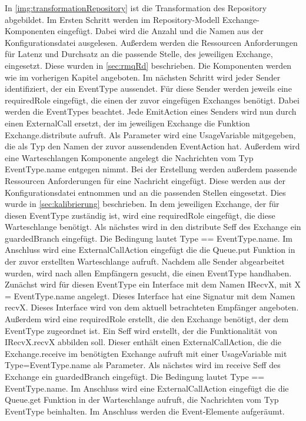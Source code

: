 In \autoref{img:transformationRepository} ist die Transformation des Repository abgebildet. Im Ersten Schritt werden im Repository-Modell Exchange-Komponenten eingefügt. Dabei wird die Anzahl und die Namen aus der Konfigurationsdatei ausgelesen. Außerdem werden die Ressourcen Anforderungen für Latenz und Durchsatz an die passende Stelle, des jeweiligen Exchange, eingesetzt. Diese wurden in \autoref{sec:rmqRd} beschrieben. Die Komponenten werden wie im vorherigen Kapitel angeboten. Im nächsten Schritt wird jeder Sender identifiziert, der ein EventType aussendet. Für diese Sender werden jeweils eine requiredRole eingefügt, die einen der zuvor eingefügen Exchanges benötigt. Dabei werden die EventTypes beachtet. Jede EmitAction eines Senders wird nun durch einen ExternalCall ersetzt, der im jeweiligen Exchange die Funktion Exchange.distribute aufruft. Als Parameter wird eine UsageVariable mitgegeben, die als Typ den Namen der zuvor aussendenden EventAction hat. Außerdem wird eine Warteschlangen Komponente angelegt die Nachrichten vom Typ EventType.name entgegen nimmt. Bei der Erstellung werden außerdem passende Ressourcen Anforderungen für eine Nachricht eingefügt. Diese werden aus der Konfigurationsdatei entnommen und an die passenden Stellen eingesetzt. Dies wurde in \autoref{sec:kalibrierung} beschrieben. In dem jeweiligen Exchange, der für diesen EventType zuständig ist, wird eine requiredRole eingefügt, die diese Warteschlange benötigt. Als nächstes wird in den distribute Seff des Exchange ein guardedBranch eingefügt. Die Bedingung lautet Type == EventType.name. Im Anschluss wird eine ExternalCallAction eingefügt die die Queue.put Funktion in der zuvor erstellten Warteschlange aufruft. Nachdem alle Sender abgearbeitet wurden, wird nach allen Empfängern gesucht, die einen EventType handhaben. Zunächst wird für diesen EventType ein Interface mit dem Namen IRecvX, mit X = EventType.name angelegt. Dieses Interface hat eine Signatur mit dem Namen recvX. Dieses Interface wird von dem aktuell betrachteten Empfänger angeboten. Außerdem wird eine requiredRole erstellt, die den Exchange benötigt, der dem EventType zugeordnet ist. Ein Seff wird erstellt, der die Funktionalität von IRecvX.recvX abbilden soll. Dieser enthält einen ExternalCallAction, die die Exchange.receive im benötigten Exchange aufruft mit einer UsageVariable mit Type=EventType.name als Parameter. Als nächstes wird im receive Seff des Exchange ein guardedBranch eingefügt. Die Bedingung lautet Type == EventType.name. Im Anschluss wird eine ExternalCallAction eingefügt die die Queue.get Funktion in der Warteschlange aufruft, die Nachrichten vom Typ EventType beinhalten. Im Anschluss werden die Event-Elemente aufgeräumt.

